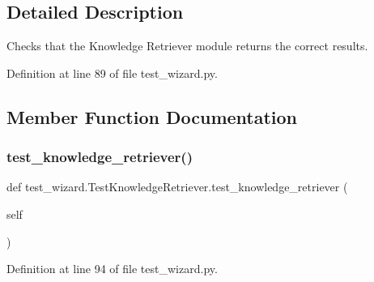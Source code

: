 \subsection{Detailed Description}
\begin{DoxyVerb}Checks that the Knowledge Retriever module returns the correct results.
\end{DoxyVerb}
 

Definition at line 89 of file test\+\_\+wizard.\+py.



\subsection{Member Function Documentation}
\mbox{\label{classtest__wizard_1_1TestKnowledgeRetriever_a3cfca11721cc581c2dde4d3cc15bb8c9}} 
\subsubsection{\texorpdfstring{test\+\_\+knowledge\+\_\+retriever()}{test\_knowledge\_retriever()}}
{\footnotesize\ttfamily def test\+\_\+wizard.\+Test\+Knowledge\+Retriever.\+test\+\_\+knowledge\+\_\+retriever (\begin{DoxyParamCaption}\item[{}]{self }\end{DoxyParamCaption})}



Definition at line 94 of file test\+\_\+wizard.\+py.


